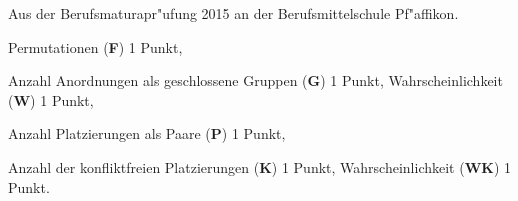 \begin{diskussion}
Aus der Berufsmaturapr"ufung 2015 an der Berufsmittelschule Pf"affikon.
\end{diskussion}

\begin{bewertung}
\begin{teilaufgaben}
\item Permutationen ({\bf F}) 1 Punkt,
\item Anzahl Anordnungen als geschlossene Gruppen ({\bf G}) 1 Punkt,
Wahrscheinlichkeit ({\bf W}) 1 Punkt,
\item Anzahl Platzierungen als Paare ({\bf P}) 1 Punkt,
\item Anzahl der konfliktfreien Platzierungen ({\bf K}) 1 Punkt,
Wahrscheinlichkeit ({\bf WK}) 1 Punkt.
\end{teilaufgaben}
\end{bewertung}

